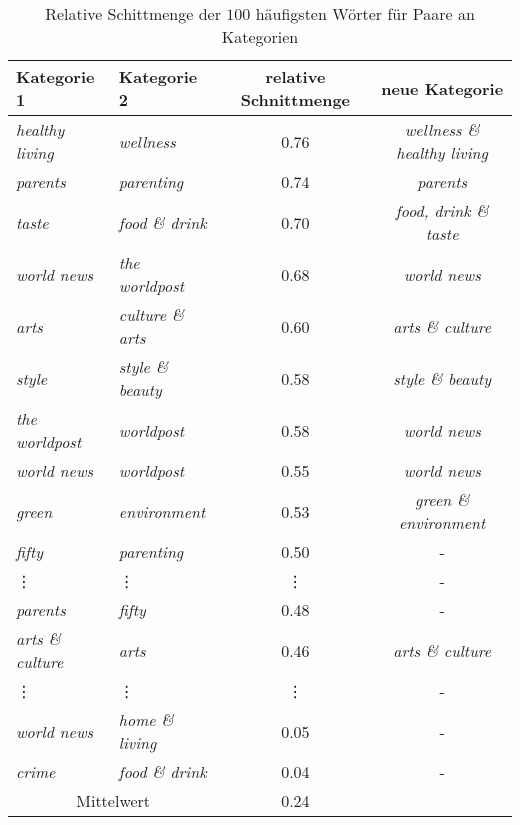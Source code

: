 \documentclass[a4paper,11pt]{article}
\begin{document}
\begin{table}[ht]
\begin{center}
\begin{tabular}{|l|l|c|c|}
  \hline
Kategorie 1 & Kategorie 2  & relative Schnittmenge & neue Kategorie\\
  \hline
\textit{healthy living} & \textit{wellness} & 0.76 & \textit{wellness \& healthy living} \\ 
  \textit{parents} & \textit{parenting} & 0.74 & \textit{parents} \\ 
  \textit{taste} & \textit{food \& drink} & 0.70 & \textit{food, drink \& taste}\\ 
  \textit{world news} & \textit{the worldpost} & 0.68 & \textit{world news}\\ 
  \textit{arts} & \textit{culture \& arts} & 0.60 & \textit{arts \& culture}\\ 
  \textit{style} & \textit{style \& beauty} & 0.58 & \textit{style \& beauty} \\ 
  \textit{the worldpost} & \textit{worldpost} & 0.58 & \textit{world news}\\ 
  \textit{world news} & \textit{worldpost} & 0.55 & \textit{world news}\\ 
  \textit{green} & \textit{environment} & 0.53 & \textit{green \& environment}\\ 
  \textit{fifty} & \textit{parenting} & 0.50 & -\\ 
    \vdots & \vdots & \vdots & -\\
  \textit{parents} & \textit{fifty} & 0.48 & - \\ 
  \textit{arts \& culture} & \textit{arts} & 0.46 & \textit{arts \& culture}\\  
  \vdots & \vdots & \vdots & -\\
  \textit{world news} & \textit{home \& living} & 0.05 & - \\ 
  \textit{crime} & \textit{food \& drink} & 0.04 & -\\
  \hline 
  \hline 
  \multicolumn{2}{|c|}{Mittelwert} &  0.24 & \\
   \hline
\end{tabular}
\caption{Relative Schittmenge der $100$ häufigsten Wörter für Paare an Kategorien}
\label{tab:categoryMerge}
\end{center}
\end{table}
\end{document}
